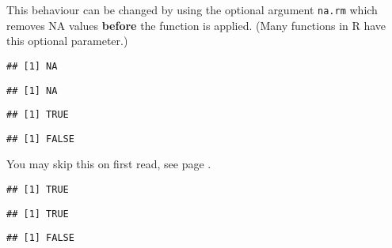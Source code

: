 \documentclass[paper=a4,10pt,div=17,headsepline,BCOR=12mm,twoside,open=right]{scrbook}\usepackage{knitr}
\begin{document}
This behaviour can be changed by using the optional argument \texttt{na.rm} which removes NA values \textbf{before} the function is applied. (Many functions in R have this optional parameter.)

\begin{knitrout}\footnotesize
{}\color{fgcolor}\begin{kframe}
\begin{alltt}
 \hlopt{<} \hlstd{)}
\end{alltt}
\begin{verbatim}
## [1] NA
\end{verbatim}
\begin{alltt}
 \hlopt{>} \hlstd{)}
\end{alltt}
\begin{verbatim}
## [1] NA
\end{verbatim}
\begin{alltt}
 \hlopt{<} \hlstd{,} \hlstd{=}\hlstd{)}
\end{alltt}
\begin{verbatim}
## [1] TRUE
\end{verbatim}
\begin{alltt}
 \hlopt{>} \hlstd{,} \hlstd{=}\hlstd{)}
\end{alltt}
\begin{verbatim}
## [1] FALSE
\end{verbatim}
\end{kframe}
\end{knitrout}

You may skip this on first read, see page \pageref{par:float}.

\begin{knitrout}\footnotesize
{}\color{fgcolor}\begin{kframe}
\begin{alltt}
 \hlopt{==}  \hlopt{+} 
\end{alltt}
\begin{verbatim}
## [1] TRUE
\end{verbatim}
\begin{alltt}
 \hlopt{==}  \hlopt{+} 
\end{alltt}
\begin{verbatim}
## [1] TRUE
\end{verbatim}
\begin{alltt}
 \hlopt{==} 
\end{alltt}
\begin{verbatim}
## [1] FALSE
\end{verbatim}
\end{kframe}
\end{knitrout}
\end{document}
